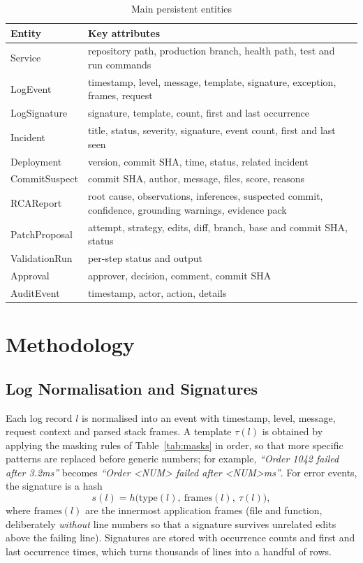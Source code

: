 \documentclass[conference]{IEEEtran}
\begin{document}
\begin{table}[t]
\centering
\caption{Main persistent entities}
\label{tab:data}
\footnotesize
\begin{tabular}{@{}p{2.0cm}p{5.7cm}@{}}
\toprule
Entity & Key attributes \\
\midrule
Service & repository path, production branch, health path, test and run commands \\
LogEvent & timestamp, level, message, template, signature, exception, frames, request \\
LogSignature & signature, template, count, first and last occurrence \\
Incident & title, status, severity, signature, event count, first and last seen \\
Deployment & version, commit SHA, time, status, related incident \\
CommitSuspect & commit SHA, author, message, files, score, reasons \\
RCAReport & root cause, observations, inferences, suspected commit, confidence, grounding warnings, evidence pack \\
PatchProposal & attempt, strategy, edits, diff, branch, base and commit SHA, status \\
ValidationRun & per-step status and output \\
Approval & approver, decision, comment, commit SHA \\
AuditEvent & timestamp, actor, action, details \\
\bottomrule
\end{tabular}
\end{table}

\section{Methodology}
\label{sec:method}
\subsection{Log Normalisation and Signatures}
\label{sec:norm}
Each log record $l$ is normalised into an event with timestamp, level, message, request context and parsed stack frames. A template $\tau(l)$ is obtained by applying the masking rules of Table~\ref{tab:masks} in order, so that more specific patterns are replaced before generic numbers; for example, \emph{``Order 1042 failed after 3.2ms''} becomes \emph{``Order \textless NUM\textgreater{} failed after \textless NUM\textgreater ms''}. For error events, the signature is a hash
\begin{equation}
s(l) = h\big(\text{type}(l),\ \text{frames}(l),\ \tau(l)\big),
\end{equation}
where $\text{frames}(l)$ are the innermost application frames (file and function, deliberately \emph{without} line numbers so that a signature survives unrelated edits above the failing line). Signatures are stored with occurrence counts and first and last occurrence times, which turns thousands of lines into a handful of rows.
\end{document}
